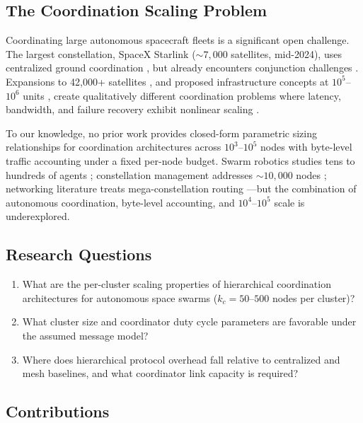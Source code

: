 \documentclass[journal]{IEEEtran}
\begin{document}
\subsection{The Coordination Scaling Problem}

Coordinating large autonomous spacecraft fleets is a significant open challenge. The largest constellation, SpaceX Starlink (${\sim}7{,}000$ satellites, mid-2024), uses centralized ground coordination \cite{starlink_ops}, but already encounters conjunction challenges \cite{esa_conjunction}. Expansions to 42{,}000+ satellites \cite{kuiper, oneweb_mgmt}, and proposed infrastructure concepts at $10^5$--$10^6$ units \cite{oneil_1976, badescu_2006}, create qualitatively different coordination problems where latency, bandwidth, and failure recovery exhibit nonlinear scaling \cite{lynch_distributed}.

To our knowledge, no prior work provides closed-form parametric sizing relationships for coordination architectures across $10^3$--$10^5$ nodes with byte-level traffic accounting under a fixed per-node budget. Swarm robotics studies tens to hundreds of agents \cite{reynolds_1987, brambilla_2013}; constellation management addresses ${\sim}10{,}000$ nodes \cite{wertz_smad}; networking literature treats mega-constellation routing \cite{handley_2018, del_portillo_mega, akyildiz_isl}---but the combination of autonomous coordination, byte-level accounting, and $10^4$--$10^5$ scale is underexplored.

\subsection{Research Questions}

\begin{enumerate}
    \item[\textbf{RQ1:}] What are the per-cluster scaling properties of hierarchical coordination architectures for autonomous space swarms ($k_c = 50$--$500$ nodes per cluster)?
    \item[\textbf{RQ2:}] What cluster size and coordinator duty cycle parameters are favorable under the assumed message model?
    \item[\textbf{RQ3:}] Where does hierarchical protocol overhead fall relative to centralized and mesh baselines, and what coordinator link capacity is required?
\end{enumerate}

\subsection{Contributions}
\end{document}

